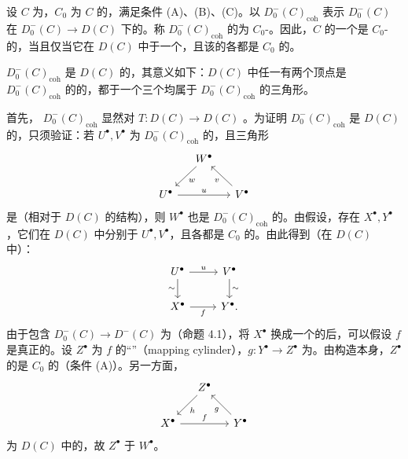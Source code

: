 设 $C$ 为，$C_0$ 为 $C$ 的，满足条件 (A)、(B)、(C)。以 $D_0^-(C)_{\mathrm{coh}}$ 表示 $D_0^-(C)$ 在 $D_0^-(C)\to D(C)$ 下的。称 $D_0^-(C)_{\mathrm{coh}}$ 的为 $C_0$-。因此，$C$ 的一个是 $C_0$-的，当且仅当它在 $D(C)$ 中于一个，且该的各都是 $C_0$ 的。

 $D_0^-(C)_{\mathrm{coh}}$ 是 $D(C)$ 的，其意义如下：$D(C)$ 中任一有两个顶点是 $D_0^-(C)_{\mathrm{coh}}$ 的的，都于一个三个均属于 $D_0^-(C)_{\mathrm{coh}}$ 的三角形。

首先， $D_0^-(C)_{\mathrm{coh}}$ 显然对 $T:D(C)\to D(C)$ 。为证明 $D_0^-(C)_{\mathrm{coh}}$ 是 $D(C)$ 的，只须验证：若 $U^\bullet,V^\bullet$ 为 $D_0^-(C)_{\mathrm{coh}}$ 的，且三角形
\[
\begin{tikzcd}[column sep=small]
&W^\bullet\arrow[dl,"w"]&\\
U^\bullet\arrow[rr,"u"]&&V^\bullet\arrow[ul,"v"]
\end{tikzcd}
\]
是（相对于 $D(C)$ 的结构），则 $W^\bullet$ 也是 $D_0^-(C)_{\mathrm{coh}}$ 的。由假设，存在 $X^\bullet,Y^\bullet$，它们在 $D(C)$ 中分别于 $U^\bullet,V^\bullet$，且各都是 $C_0$ 的。由此得到（在 $D(C)$ 中）：
\[
\begin{tikzcd}
U^\bullet\arrow[r,"u"]\arrow[d,"\sim"']&V^\bullet\arrow[d,"\sim"]\\
X^\bullet\arrow[r,"f"']&Y^\bullet.
\end{tikzcd}
\]
由于包含 $D_0^-(C)\to D^-(C)$ 为（命题 4.1），将 $X^\bullet$ 换成一个的后，可以假设 $f$ 是真正的。设 $Z^\bullet$ 为 $f$ 的“”（mapping cylinder），$g:Y^\bullet\to Z^\bullet$ 为。由构造本身，$Z^\bullet$ 的是 $C_0$ 的（条件 (A)）。另一方面，
\[
\begin{tikzcd}[column sep=small]
&Z^\bullet\arrow[dl,"h"]&\\
X^\bullet\arrow[rr,"f"]&&Y^\bullet\arrow[ul,"g"]
\end{tikzcd}
\]
为 $D(C)$ 中的，故 $Z^\bullet$ 于 $W^\bullet$。

